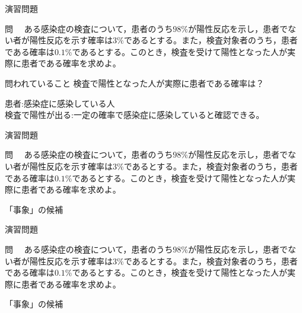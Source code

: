 \documentclass[aspectratio=169, dvipdfmx, 11pt]{beamer}
\begin{document}
\begin{frame}{演習問題}

\begin{block}{問}
　ある感染症の検査について，患者のうち$98\%$が陽性反応を示し，患者でない者が陽性反応を示す確率は$3\%$であるとする。また，検査対象者のうち，患者である確率は$0.1\%$であるとする。このとき，検査を受けて陽性となった人が実際に患者である確率を求めよ。
\end{block}

\begin{alertblock}{問われていること}
検査で陽性となった人が実際に患者である確率は？
\end{alertblock}

\begin{tcolorbox}[colframe=blue,
    colback=blue!10!white,
    colbacktitle=blue!40!white,
    coltitle=black, fonttitle=\bfseries,
    title=言葉の説明]
患者:感染症に感染している人 \\
検査で陽性が出る:一定の確率で感染症に感染していると確認できる。
\end{tcolorbox}

\end{frame}


\begin{frame}{演習問題}

\begin{block}{問}
　ある感染症の検査について，患者のうち$98\%$が陽性反応を示し，患者でない者が陽性反応を示す確率は$3\%$であるとする。また，検査対象者のうち，患者である確率は$0.1\%$であるとする。このとき，検査を受けて陽性となった人が実際に患者である確率を求めよ。
\end{block}

\begin{alertblock}{「事象」の候補}
\end{alertblock}

\end{frame}


\begin{frame}{演習問題}

\begin{block}{問}
　ある感染症の検査について，患者のうち$98\%$が陽性反応を示し，患者でない者が陽性反応を示す確率は$3\%$であるとする。また，検査対象者のうち，患者である確率は$0.1\%$であるとする。このとき，検査を受けて陽性となった人が実際に患者である確率を求めよ。
\end{block}

\begin{alertblock}{「事象」の候補}
\end{alertblock}

\begin{tcolorbox}[colframe=blue,
    colback=blue!10!white,
    colbacktitle=blue!40!white,
    coltitle=black, fonttitle=\bfseries,
    title=hint\ 問題文中にある確率]
\end{tcolorbox}

\end{frame}
\end{document}
